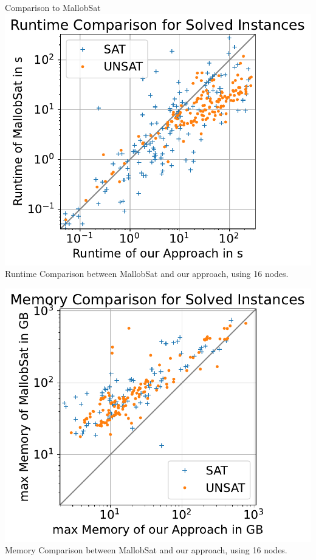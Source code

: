 \documentclass[]{sdqbeamer}
\begin{document}
\begin{frame}{Comparison to MallobSat}
    \center
    \includegraphics[scale=.8]{plots/square_runtime_compare/square_runtime_16node.pdf}\\
    Runtime Comparison between MallobSat and our approach, using 16 nodes.
\end{frame}

\begin{frame}{}
    \center
    \includegraphics[scale=.8]{plots/square_mem_compare/square_mem_16node.pdf}\\
    Memory Comparison between MallobSat and our approach, using 16 nodes.
\end{frame}
\end{document}
